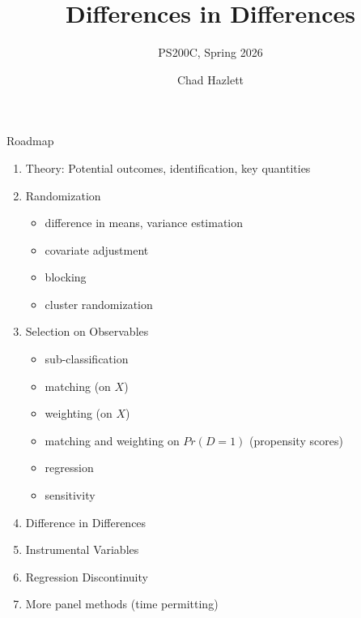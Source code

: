 \documentclass[xcolor=dvipsnames]{beamer}
\title[]{Differences in Differences}
\subtitle[ ]{PS200C, Spring 2026}
\author[Hazlett]{Chad Hazlett }
\institute[UCLA]{UCLA\\[1ex]
  \texttt{chazlett@ucla.edu}
}
\date{}
\begin{document}
\subject{Talks}


\begin{frame}
  \titlepage
\end{frame}

\begin{frame}{Roadmap}
\begin{enumerate}
\item Theory: Potential outcomes, identification, key quantities
\item Randomization
\begin{itemize}
\item difference in means, variance estimation
\item covariate adjustment
\item blocking
\item cluster randomization
\end{itemize}
\item Selection on Observables
\begin{itemize}
\item sub-classification
\item matching (on $X$)
\item weighting (on $X$)
\item matching and weighting on $Pr(D=1)$ (propensity scores)
\item regression 
\item sensitivity
\end{itemize}
\item Difference in Differences
\item Instrumental Variables
\item Regression Discontinuity
\item More panel methods (time permitting)
\end{enumerate}
\end{frame}
\end{document}
